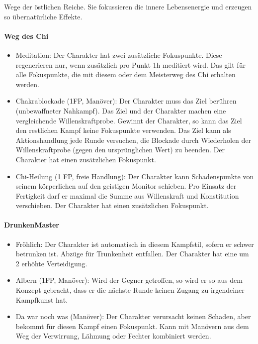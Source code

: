 \documentclass{article}
\begin{document}
Wege der östlichen Reiche. Sie fokussieren die innere Lebensenergie und erzeugen so übernatürliche Effekte.

\paragraph{Weg des Chi}

\begin{itemize}
\item Meditation: Der Charakter hat zwei zusätzliche Fokuspunkte. Diese regenerieren nur, wenn zusätzlich pro Punkt 1h meditiert wird. Das gilt für alle Fokuspunkte, die mit diesem oder dem Meisterweg des Chi erhalten werden.
\item Chakrablockade (1FP, Manöver): Der Charakter muss das Ziel berühren (unbewaffneter Nahkampf). Das Ziel und der Charakter machen eine vergleichende Willenskraftprobe. Gewinnt der Charakter, so kann das Ziel den restlichen Kampf keine Fokuspunkte verwenden. Das Ziel kann als Aktionshandlung jede Runde versuchen, die Blockade durch Wiederholen der Willenskraftprobe (gegen den ursprünglichen Wert) zu beenden. Der Charakter hat einen zusätzlichen Fokuspunkt.
\item Chi-Heilung (1 FP, freie Handlung): Der Charakter kann Schadenspunkte von seinem körperlichen auf den geistigen Monitor schieben. Pro Einsatz der Fertigkeit darf er maximal die Summe aus Willenskraft und Konstitution verschieben. Der Charakter hat einen zusätzlichen Fokuspunkt.
\end{itemize}

\paragraph{DrunkenMaster}

\begin{itemize}
\item Fröhlich: Der Charakter ist automatisch in diesem Kampfstil, sofern er schwer betrunken ist. Abzüge für Trunkenheit entfallen. Der Charakter hat eine um 2 erhöhte Verteidigung.
\item Albern (1FP, Manöver): Wird der Gegner getroffen, so wird er so aus dem Konzept gebracht, dass er die nächste Runde keinen Zugang zu irgendeiner Kampfkunst hat.
\item Da war noch was (Manöver): Der Charakter verursacht keinen Schaden, aber bekommt für diesen Kampf einen Fokuspunkt. Kann mit Manövern aus dem Weg der Verwirrung, Lähmung oder Fechter kombiniert werden.
\end{itemize}
\end{document}

